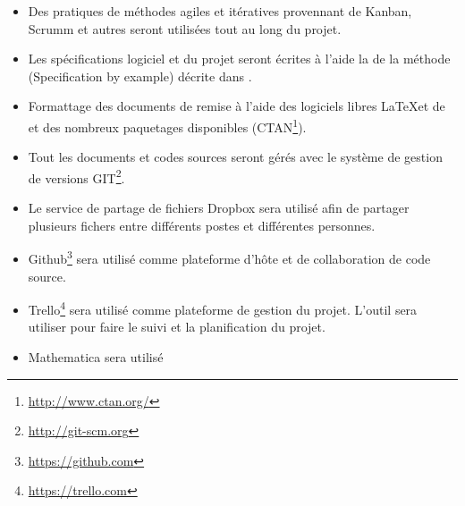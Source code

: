 \documentclass[11pt]{article}
\begin{document}
\begin{itemize}[label={$\bullet$}]
  \item Des pratiques de méthodes agiles et itératives provennant de Kanban, Scrumm et autres seront utilisées tout au long du projet.
  \item Les spécifications logiciel et du projet seront écrites à l'aide la de la méthode (Specification by example) décrite dans \cite{Adzic11}.

  \item Formattage des documents de remise à l'aide des logiciels libres \LaTeX et de \XeLaTeX et des nombreux paquetages disponibles (CTAN\footnote{\url{http://www.ctan.org/}}).

  \item Tout les documents et codes sources seront gérés avec le système de gestion de versions GIT\footnote{\url{http://git-scm.org}}.

  \item Le service de partage de fichiers Dropbox sera utilisé afin de partager plusieurs fichers entre différents postes et différentes personnes.

  \item Github\footnote{\url{https://github.com}} sera utilisé comme plateforme d'hôte et de collaboration de code source.

  \item Trello\footnote{\url{https://trello.com}} sera utilisé comme plateforme de gestion du projet. L'outil sera utiliser pour faire le suivi et la planification du projet.

  \item Mathematica sera utilisé
\end{itemize}

%

%
%


\clearpage

\end{document}
